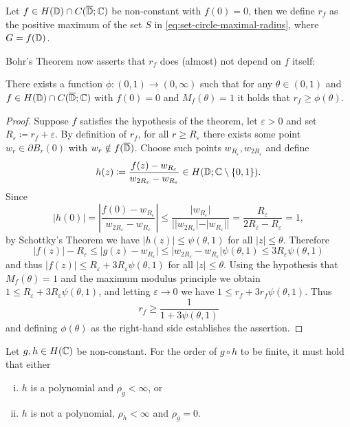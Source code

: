 \begin{definition}
    Let $f \in H(\mathbb{D}) \cap C(\overline{\mathbb{D}}; \mathbb{C})$ be non-constant with $f(0) = 0$, then we define $r_f$ as the positive maximum of the set $S$ in \eqref{eq:set-circle-maximal-radius}, where $G = f(\mathbb{D})$.
\end{definition}

Bohr's Theorem now asserts that $r_f$ does (almost) not depend on $f$ itself:

\begin{theorem}[Bohr] \label{thm:bohr}
    There exists a function ${\phi : (0, 1) \to (0, \infty)}$ such that for any $\theta \in (0, 1)$ and $f \in H(\mathbb{D}) \cap C(\overline{\mathbb{D}}; \mathbb{C})$ with $f(0) = 0$ and $M_f(\theta) = 1$ it holds that $r_f \geq \phi(\theta)$.
\end{theorem}

\begin{proof}
    Suppose $f$ satisfies the hypothesis of the theorem, let $\varepsilon > 0$ and set $R_\varepsilon \coloneqq r_f + \varepsilon$. By definition of $r_f$, for all $r \geq R_\varepsilon$ there exists some point $w_r \in \partial B_r(0)$ with $w_r \notin f(\overline{\mathbb{D}})$. Choose such points $w_{R_\varepsilon}, w_{2 R_\varepsilon}$ and define
    $$ h(z) \coloneqq \frac{f(z) - w_{R_\varepsilon}}{w_{2 R_\varepsilon} - w_{R_\varepsilon}} \in H(\mathbb{D}; \mathbb{C} \setminus \{ 0, 1 \}). $$
    Since
    $$ \vert h(0) \vert = \left\vert \frac{f(0) - w_{R_\varepsilon}}{w_{2 R_\varepsilon} - w_{R_\varepsilon}} \right\vert \leq \frac{\vert w_{R_\varepsilon} \vert}{\vert \vert w_{2 R_\varepsilon} \vert - \vert w_{R_\varepsilon} \vert \vert} = \frac{R_\varepsilon}{2 R_\varepsilon - R_\varepsilon} = 1, $$
    by Schottky's Theorem we have $\vert h(z) \vert \leq \psi(\theta, 1)$ for all $\vert z \vert \leq \theta$. Therefore
    $$ \vert f(z) \vert - R_\varepsilon \leq \vert g(z) - w_{R_\varepsilon} \vert \leq \vert w_{2 R_\varepsilon} - w_{R_\varepsilon} \vert \psi(\theta, 1) \leq 3 R_\varepsilon \psi(\theta, 1) $$
    and thus $\vert f(z) \vert \leq R_\varepsilon + 3 R_\varepsilon \psi(\theta, 1)$ for all $\vert z \vert \leq \theta$. Using the hypothesis that $M_f(\theta) = 1$ and the maximum modulus principle we obtain $1 \leq R_\varepsilon + 3 R_\varepsilon \psi(\theta, 1)$, and letting $\varepsilon \to 0$ we have $1 \leq r_f + 3 r_f \psi(\theta, 1)$. Thus
    $$ r_f \geq \frac{1}{1 + 3 \psi(\theta, 1)}$$
    and defining $\phi(\theta)$ as the right-hand side establishes the assertion.
\end{proof}

\begin{theorem}[Pólya] \label{thm:polya}
    Let $g, h \in H(\mathbb{C})$ be non-constant. For the order of $g \circ h$ to be finite, it must hold that either
    \begin{enumerate}[i.]
        \item $h$ is a polynomial and $\rho_g < \infty$, or
        \item $h$ is not a polynomial, $\rho_h < \infty$ and $\rho_g = 0$.
    \end{enumerate}
\end{theorem}

